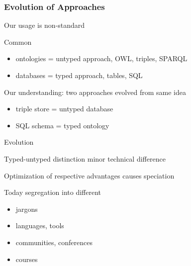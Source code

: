 \begin{frame}\frametitle{Evolution of Approaches}
\begin{blockitems}{Our usage is non-standard}
 \item Common
  \begin{itemize}
  \item ontologies = untyped approach, OWL, triples,  SPARQL
  \item databases = typed approach, tables, SQL
  \end{itemize}
 \item Our understanding: two approaches evolved from same idea
	\begin{itemize}
	\item triple store = untyped database
	\item SQL schema = typed ontology
	\end{itemize}
\end{blockitems}

\begin{blockitems}{Evolution}
\item Typed-untyped distinction minor technical difference
\item Optimization of respective advantages causes speciation
\item Today segregation into different
 \begin{itemize}
 \item jargons
 \item languages, tools
 \item communities, conferences
 \item courses
 \end{itemize}
\end{blockitems}
\end{frame}

